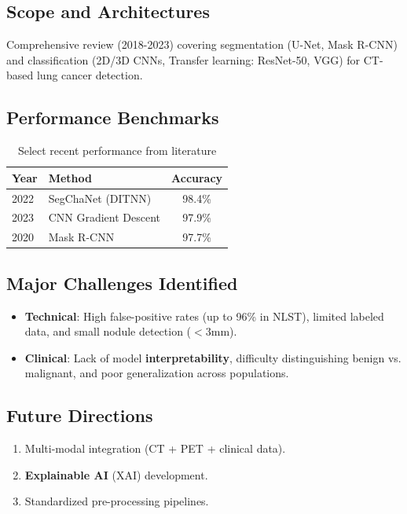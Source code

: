 \documentclass[10pt,a4paper]{article}
\begin{document}
\subsection{Scope and Architectures}
Comprehensive review (2018-2023) covering segmentation (U-Net, Mask R-CNN) and classification (2D/3D CNNs, Transfer learning: ResNet-50, VGG) for CT-based lung cancer detection.
\vspace{-0.2cm}

\subsection{Performance Benchmarks}

\begin{table}[h]
    \centering
    \begin{tabular}{llc}
        \toprule
        \textbf{Year} & \textbf{Method} & \textbf{Accuracy} \\
        \midrule
        2022 & SegChaNet (DITNN) & 98.4\% \\
        2023 & CNN Gradient Descent & 97.9\% \\
        2020 & Mask R-CNN & 97.7\% \\
        \bottomrule
    \end{tabular}
    \caption{Select recent performance from literature}
\end{table}
\vspace{-0.3cm}

\subsection{Major Challenges Identified}
\begin{itemize}[noitemsep, topsep=0pt, parsep=0pt, leftmargin=1em]
    \item \textbf{Technical}: High false-positive rates (up to 96\% in NLST), limited labeled data, and small nodule detection ($<3$mm).
    \item \textbf{Clinical}: Lack of model \textbf{interpretability}, difficulty distinguishing benign vs. malignant, and poor generalization across populations.
\end{itemize}
\vspace{-0.2cm}

\subsection{Future Directions}
\begin{enumerate}[noitemsep, topsep=0pt, parsep=0pt, leftmargin=1.5em]
    \item Multi-modal integration (CT + PET + clinical data).
    \item \textbf{Explainable AI} (XAI) development.
    \item Standardized pre-processing pipelines.
\end{enumerate}
\vspace{-0.2cm}
\end{document}
